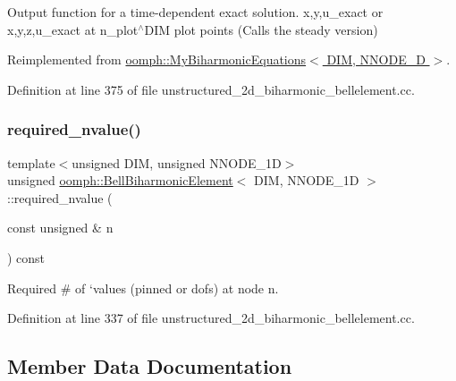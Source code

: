 Output function for a time-\/dependent exact solution. x,y,u\+\_\+exact or x,y,z,u\+\_\+exact at n\+\_\+plot$^\wedge$\+D\+IM plot points (Calls the steady version) 



Reimplemented from \hyperlink{classoomph_1_1MyBiharmonicEquations_a95b35b18fac5212ade1a81c26657bcdb}{oomph\+::\+My\+Biharmonic\+Equations$<$ D\+I\+M, N\+N\+O\+D\+E\+\_\+D $>$}.



Definition at line 375 of file unstructured\+\_\+2d\+\_\+biharmonic\+\_\+bellelement.\+cc.

\mbox{\label{classoomph_1_1BellBiharmonicElement_a342b59354c4d109da9cda12aad79f293}} 
\subsubsection{\texorpdfstring{required\+\_\+nvalue()}{required\_nvalue()}}
{\footnotesize\ttfamily template$<$unsigned D\+IM, unsigned N\+N\+O\+D\+E\+\_\+1D$>$ \\
unsigned \hyperlink{classoomph_1_1BellBiharmonicElement}{oomph\+::\+Bell\+Biharmonic\+Element}$<$ D\+IM, N\+N\+O\+D\+E\+\_\+1D $>$\+::required\+\_\+nvalue (\begin{DoxyParamCaption}\item[{const unsigned \&}]{n }\end{DoxyParamCaption}) const\hspace{0.3cm}{\ttfamily [inline]}}



Required \# of `values\textquotesingle{} (pinned or dofs) at node n. 



Definition at line 337 of file unstructured\+\_\+2d\+\_\+biharmonic\+\_\+bellelement.\+cc.



\subsection{Member Data Documentation}
\mbox{\label{classoomph_1_1BellBiharmonicElement_af13af063a582a21866c4096ef99e67de}} 
